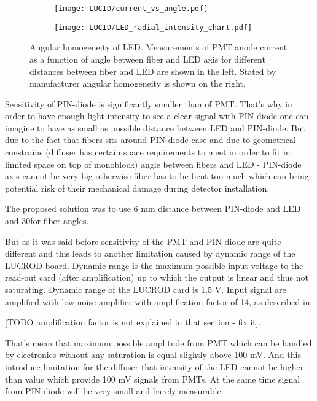 \begin{figure}
\begin{subfigure}{.46\textwidth}
  \centering
  \texttt{[image: LUCID/current\_vs\_angle.pdf]}
\end{subfigure}
\begin{subfigure}{.51\textwidth}
  \centering
  \texttt{[image: LUCID/LED\_radial\_intensity\_chart.pdf]}
\end{subfigure}

\caption{Angular homogeneity of LED. Measurements of PMT anode current as a function of angle between fiber and LED axis for different distances between fiber and LED are shown in the left.
	 Stated by manufacturer angular homogeneity is shown on the right.}
\label{fig:AngularDistributionOfLED}
\end{figure}

Sensitivity of PIN-diode is significantly smaller than of PMT.
That's why in order to have enough light intensity to see a clear signal with PIN-diode one can imagine to have as small as possible
distance between LED and PIN-diode. But due to the fact that fibers sits around PIN-diode case and due to geometrical constrains 
(diffuser has certain space requirements to meet in order to fit in limited space on top of monoblock) angle between fibers and LED - PIN-diode axis cannot be very big
otherwise fiber has to be bent too much which can bring potential risk of their mechanical damage during detector installation.

The proposed solution was to use 6 mm distance between PIN-diode and LED and 30\degree for fiber angles.

But as it was said before sensitivity of the PMT and PIN-diode are quite different and this leads to another limitation caused by dynamic range of the LUCROD board.
Dynamic range is the maximum possible input voltage to the read-out card (after amplification) up to which the output is linear and thus not saturating.
Dynamic range of the LUCROD card is 1.5 V. 
Input signal are amplified with low noise amplifier with amplification factor of 14, as described in  

[TODO amplification factor is not explained in that section  - fix it].

That's mean that maximum possible amplitude from PMT which can be handled by electronics without any saturation is equal slightly above 100 mV.
And this introduce limitation for the diffuser that intensity of the LED cannot be higher than value which provide 100 mV signals from PMTs.
At the same time signal from PIN-diode will be very small and barely measurable.

